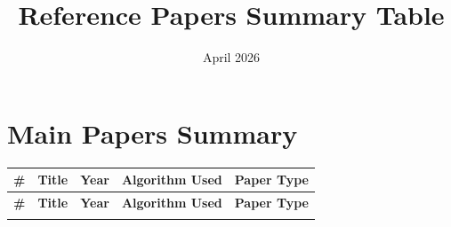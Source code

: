 \documentclass[12pt]{article}
\begin{document}
\title{Reference Papers Summary Table}
\author{}
\date{April 2026}

\maketitle

\section{Main Papers Summary}

\begin{longtable}{|p{0.5cm}|p{4.5cm}|p{1cm}|p{3cm}|p{2cm}|}
	\toprule
	\textbf{\#} & \textbf{Title}                                                                                                                                        & \textbf{Year} & \textbf{Algorithm Used}                                          & \textbf{Paper Type} \\
	\midrule
	\endfirsthead
	\toprule
	\textbf{\#} & \textbf{Title}                                                                                                                                        & \textbf{Year} & \textbf{Algorithm Used}                                          & \textbf{Paper Type} \\
	\midrule
	\endhead
	\midrule
	\endfoot
	\bottomrule
	\endlastfoot


\end{longtable}
\end{document}
